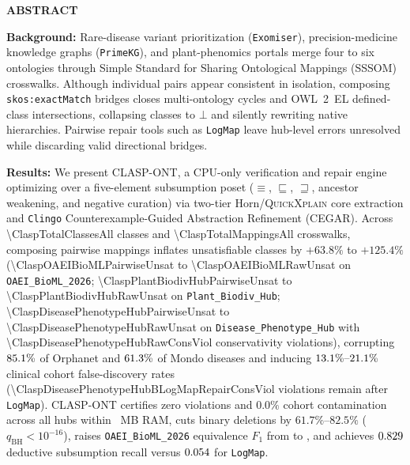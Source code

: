 \documentclass[10pt]{article}
\theoremstyle{accentdef}
\renewenvironment{abstract}{%
  \vspace{4pt}%
  \begin{tcolorbox}[
    enhanced,
    breakable,
    colback=tintbg,
    colframe=hairline,
    boxrule=0.4pt,
    borderline west={2.6pt}{0pt}{accent},
    sharp corners,
    left=11pt,
    right=11pt,
    top=9pt,
    bottom=9pt
  ]%
  {\small\bfseries\color{accent}\lsstyle ABSTRACT}\par\vspace{4pt}%
  \small\linespread{1.05}\selectfont
}{%
  \end{tcolorbox}%
  \vspace{4pt}%
}
\begin{document}
\begin{abstract}
\textbf{\color{accent}Background:} Rare-disease variant prioritization (\texttt{Exomiser}), precision-medicine knowledge graphs (\texttt{PrimeKG}), and plant-phenomics portals merge four to six ontologies through Simple Standard for Sharing Ontological Mappings (SSSOM) crosswalks. Although individual pairs appear consistent in isolation, composing \texttt{skos:exactMatch} bridges closes multi-ontology cycles and OWL~2~EL defined-class intersections, collapsing classes to $\bot$ and silently rewriting native hierarchies. Pairwise repair tools such as \texttt{LogMap} leave hub-level errors unresolved while discarding valid directional bridges.

\vspace{3pt}
\textbf{\color{accent}Results:} We present \textsc{CLASP-ONT}, a CPU-only verification and repair engine optimizing over a five-element subsumption poset ($\equiv$, $\sqsubseteq$, $\sqsupseteq$, ancestor weakening, and negative curation) via two-tier Horn/\textsc{QuickXplain} core extraction and \texttt{Clingo} Counterexample-Guided Abstraction Refinement (CEGAR). Across \num{\ClaspTotalClassesAll} classes and \num{\ClaspTotalMappingsAll} crosswalks, composing pairwise mappings inflates unsatisfiable classes by $+63.8\%$ to $+125.4\%$ (\num{\ClaspOAEIBioMLPairwiseUnsat} to \num{\ClaspOAEIBioMLRawUnsat} on \texttt{OAEI\_BioML\_2026}; \num{\ClaspPlantBiodivHubPairwiseUnsat} to \num{\ClaspPlantBiodivHubRawUnsat} on \texttt{Plant\_Biodiv\_Hub}; \num{\ClaspDiseasePhenotypeHubPairwiseUnsat} to \num{\ClaspDiseasePhenotypeHubRawUnsat} on \texttt{Disease\_Phenotype\_Hub} with \num{\ClaspDiseasePhenotypeHubRawConsViol} conservativity violations), corrupting $85.1{}\%$ of Orphanet and $61.3{}\%$ of Mondo diseases and inducing $13.1{}\%\text{--}21.1{}\%$ clinical cohort false-discovery rates (\num{\ClaspDiseasePhenotypeHubBLogMapRepairConsViol} violations remain after \texttt{LogMap}). \textsc{CLASP-ONT} certifies zero violations and $0.0\%$ cohort contamination across all hubs within \ClaspMaxPeakRssMBAll{}~MB RAM, cuts binary deletions by $61.7\%\text{--}82.5\%$ ($q_{\mathrm{BH}} < 10^{-16}$), raises \texttt{OAEI\_BioML\_2026} equivalence $F_1$ from \ClaspOAEIBioMLBASPBinaryDeleteEquivFone{} to \ClaspOAEIBioMLBLexicalLatticeEquivFone{}, and achieves $0.829{}$ deductive subsumption recall versus $0.054{}$ for \texttt{LogMap}.


\end{abstract}
\end{document}
